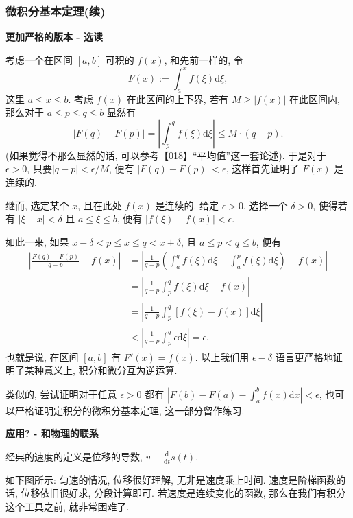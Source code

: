\hypertarget{ux5faeux79efux5206ux57faux672cux5b9aux7406ux7eed}{%
\subsubsection{微积分基本定理(续)}\label{ux5faeux79efux5206ux57faux672cux5b9aux7406ux7eed}}

\textbf{更加严格的版本 - 选读}

考虑一个在区间 \([a,b]\) 可积的 \(f(x)\), 和先前一样的, 令 \[
F(x):=\int_a^xf(\xi)\mathrm{d}\xi,
\] 这里 \(a\le x \le b\). 考虑 \(f(x)\) 在此区间的上下界, 若有
\(M\ge |f(x)|\) 在此区间内, 那么对于 \(a\le p \le q \le b\) 显然有 \[
|F(q)-F(p)|=\left|\int_p^qf(\xi)\mathrm{d}\xi\right|\le M\cdot(q-p).
\] (如果觉得不那么显然的话, 可以参考【018】``平均值''这一套论述).
于是对于 \(\epsilon>0\), 只要\(|q-p|<\epsilon/M\), 便有
\(|F(q)-F(p)|<\epsilon\), 这样首先证明了 \(F(x)\) 是连续的.

继而, 选定某个 \(x\), 且在此处 \(f(x)\) 是连续的. 给定 \(\epsilon>0\),
选择一个 \(\delta>0\), 使得若有 \(|\xi-x|<\delta\) 且 \(a\le\xi\le b\),
便有 \(|f(\xi)-f(x)|<\epsilon\).

如此一来, 如果 \(x-\delta<p\le x\le q<x+\delta\), 且 \(a\le p<q\le b\),
便有 \[
\begin{aligned}
\left|\frac{F(q)-F(p)}{q-p}-f(x)\right|&=\left|\frac{1}{q-p}\left(\int_a^qf(\xi)\mathrm{d}\xi-\int_a^pf(\xi)\mathrm{d}\xi\right)-f(x)\right|\\
&=\left|\frac{1}{q-p}\int_p^qf(\xi)\mathrm{d}\xi-f(x)\right|\\
&=\left|\frac{1}{q-p}\int_p^q[f(\xi)-f(x)]\mathrm{d}\xi\right|\\
&<\left|\frac{1}{q-p}\int_p^q\epsilon\mathrm{d}\xi\right|=\epsilon.
\end{aligned}
\] 也就是说, 在区间 \([a,b]\) 有 \(F'(x)=f(x)\). 以上我们用
\(\epsilon-\delta\) 语言更严格地证明了某种意义上, 积分和微分互为逆运算.

类似的, 尝试证明对于任意 \(\epsilon>0\) 都有
\(\left|F(b)-F(a)-\int_a^bf(x)\mathrm{d}x\right|<\epsilon\),
也可以严格证明定积分的微积分基本定理, 这一部分留作练习.

\textbf{应用? - 和物理的联系}

经典的速度的定义是位移的导数,
\(v\equiv \frac{\mathrm{d}}{\mathrm{d}t}s(t)\).

如下图所示: 匀速的情况, 位移很好理解, 无非是速度乘上时间.
速度是阶梯函数的话, 位移依旧很好求, 分段计算即可.
若速度是连续变化的函数, 那么在我们有积分这个工具之前, 就非常困难了.

